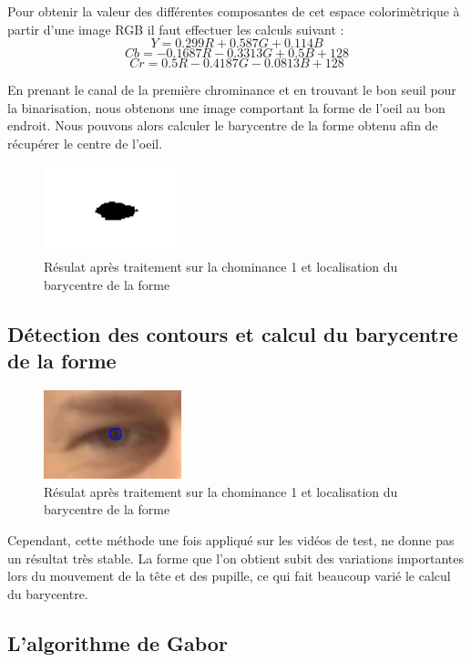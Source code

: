 Pour obtenir la valeur des différentes composantes de cet espace colorimètrique à partir
d'une image RGB il faut effectuer les calculs suivant :
$$Y = 0.299R + 0.587 G + 0.114 B$$
$$Cb = -0.1687R - 0.3313 G + 0.5B + 128$$
$$Cr = 0.5R -0.4187G -0.0813B + 128$$


En prenant le canal de la première chrominance et en trouvant le bon seuil pour la binarisation,
nous obtenons une image comportant la forme de l'oeil au bon endroit. Nous pouvons alors calculer
le barycentre de la forme obtenu afin de récupérer le centre de l'oeil.

\begin{figure}[H]
 \center
 \includegraphics[width=4cm]{image/pupille.png}
 \caption{Résulat après traitement sur la chominance 1 et localisation du barycentre de la forme}
\end{figure}

\subsection{Détection des contours et calcul du barycentre de la forme}


\begin{figure}[H]
 \center
 \includegraphics[width=4cm]{image/localisation1.png}
 \caption{Résulat après traitement sur la chominance 1 et localisation du barycentre de la forme}
\end{figure}

Cependant, cette méthode une fois appliqué sur les vidéos de test, ne donne pas un résultat très stable.
La forme que l'on obtient subit des variations importantes lors du mouvement de la tête et des pupille,
ce qui fait beaucoup varié le calcul du barycentre.

\subsection{L'algorithme de Gabor}